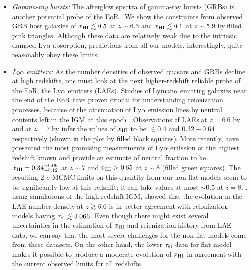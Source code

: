 \documentclass[useAMS,usenatbib]{mnras}
\begin{document}
\begin{itemize}
 \item {\it Gamma-ray bursts:} The afterglow spectra of gamma-ray bursts (GRBs) is another potential probe
 of the EoR \citep{2006ApJ...642..382B}. We show the constraints from observed GRB host galaxies of $x_{\rm HI}\lesssim0.5$
 at $z\sim6.3$ \citep{2006PASJ...58..485T} and $x_{\rm HI}\lesssim0.1$ at $z\sim5.9$ \citep{2013ApJ...774...26C}
 by filled pink triangles. Although these data are relatively weak due to the intrinsic damped Ly$\alpha$
 absorption, predictions from all our models, interestingly, quite reasonably 
 obey these limits.
 
 \item {\it Ly$\alpha$ emitters:} As the number densities of observed quasars and GRBs decline at high redshifts,
 one must look at the next higher-redshift reliable probe of the EoR, the Ly$\alpha$ emitters (LAEs).
 Studies of Lyman$\alpha$ emitting galaxies near the end of the EoR have proven crucial for understanding
 reionization processes, because of the attenuation of Ly$\alpha$ emission lines by neutral contents left in the IGM at this epoch
 \citep{2009ApJ...696.1164O}. Observations of LAEs at $z=6.6$ by \cite{2010ApJ...723..869O} and at $z=7$ by
 \cite{2008ApJ...677...12O} infer the values of $x_{\rm HI}$ to be $\lesssim0.4$ and $0.32-0.64$ respectively
 (shown in the plot by filled black squares). More recently, \cite{2014ApJ...795...20S} have presented the most promising
 measurements of Ly$\alpha$ emission at the highest redshift known and provide an estimate of neutral
 fraction to be $x_{\rm HI}=0.34^{+0.09}_{-0.12}$ at $z\sim7$ and $x_{\rm HI}>0.65$ at $z\sim8$ (filled green squares).
 The resulting 2-$\sigma$ MCMC limits on this quantity from our non-flat models seem to be significantly low at this
 redshift; it can take values at most $\sim0.5$ at $z=8$.
\citet{2015MNRAS.452..261C}, using simulations of the high-redshift IGM, showed that the evolution
in the LAE number density at $z \gtrsim 6.6$ is in better agreement with reionization models having $\tau_{\rm el} \lesssim 0.066$.
 Even though there might exist several uncertainties in the estimation of $x_{\rm HI}$ and reionization history from LAE data, we can
 say that the most severe challenges for the non-flat models come from
these datasets.
 On the other hand, the lower $\tau_{\rm el}$ data for flat model makes it possible to produce a moderate
 evolution of $x_{\rm HI}$ in agreement with the current observed limits for all redshifts.
\end{itemize}
\end{document}
